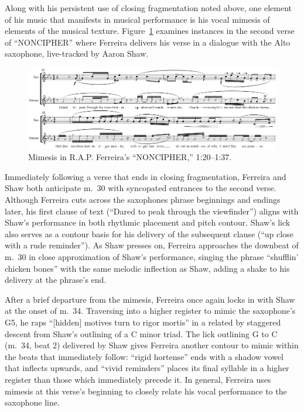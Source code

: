Along with his persistent use of closing fragmentation noted above, one element of his music that manifests
in musical performance is his vocal mimesis of elements of the musical texture. Figure~\ref{fig:rorymimesis}
examines instances in the second verse of ``NONCIPHER'' where Ferreira delivers his verse in a dialogue with
the Alto saxophone, live-tracked by Aaron Shaw.
    \begin{figure}[!t]
        \centering
        \includegraphics{images/figures/chp 03/120137nonciphermimesis.pdf}
        \caption{Mimesis in R.A.P. Ferreira's ``NONCIPHER,'' 1:20--1:37.}
        \label{fig:rorymimesis}
    \end{figure}
Immediately following a verse that ends in closing fragmentation, Ferreira and Shaw both anticipate m.~30
with syncopated entrances to the second verse. Although Ferreira cuts across the saxophones phrase beginnings
and endings later, his first clause of text (``Dared to peak through the viewfinder'') aligns with Shaw's
performance in both rhythmic placement and pitch contour. Shaw's lick also serves as a contour basis for
his delivery of the subsequent clause (``up close with a rude reminder''). As Shaw presses on, Ferreira
approaches the downbeat of m.~30 in close approximation of Shaw's performance, singing the phrase
``shufflin' chicken bones'' with the same melodic inflection as Shaw, adding a shake to his delivery
at the phrase's end.

After a brief departure from the mimesis, Ferreira once again locks in with Shaw at the onset of m.~34.
Traversing into a higher register to mimic the saxophone's G5, he raps ``[hidden] motives turn to rigor
mortis'' in a related by staggered descent from Shaw's outlining of a C minor triad. The lick outlining
G to C (m.~34, beat 2) delivered by Shaw gives Ferreira another contour to mimic within the beats that
immediately follow: ``rigid hortense'' ends with a shadow vowel that inflects upwards, and ``vivid
reminders'' places its final syllable in a higher register than those which immediately precede it. In
general, Ferreira uses mimesis at this verse's beginning  to closely relate his vocal performance to 
the saxophone line.

